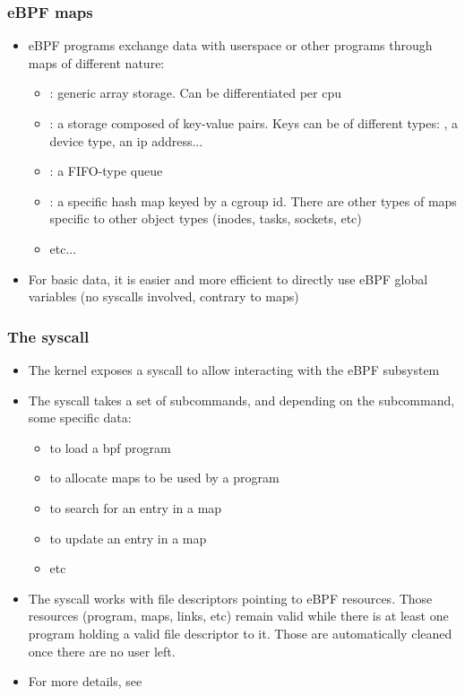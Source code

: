 \begin{frame}[fragile]
  \frametitle{eBPF maps}
  \begin{itemize}
    \item eBPF programs exchange data with userspace or other programs through
    maps of different nature:
    \begin{itemize}
      \item {}: generic array storage. Can be
      differentiated per cpu
      \item {}: a storage composed of key-value pairs.
      Keys can be of different types: , a device type, an ip address...
      \item {}: a FIFO-type queue
      \item {}: a specific hash map keyed by a
      cgroup id. There are other types of maps specific to other object types
      (inodes, tasks, sockets, etc)
      \item etc...
    \end{itemize}
    \item For basic data, it is easier and more efficient to directly use eBPF
    global variables (no syscalls involved, contrary to maps)
  \end{itemize}
\end{frame}

\begin{frame}[fragile]
  \frametitle{The  syscall}
  \begin{itemize}
    \item The kernel exposes a  syscall to allow interacting with the
    eBPF subsystem
    \item The syscall takes a set of subcommands, and depending on the
    subcommand, some specific data:
    \begin{itemize}
      \item {} to load a bpf program
      \item {} to allocate maps to be used by a program
      \item {} to search for an entry in a map
      \item {} to update an entry in a map
      \item etc
    \end{itemize}
    \item The syscall works with file descriptors pointing to eBPF resources.
    Those resources (program, maps, links, etc) remain valid while there is at least
    one program holding a valid file descriptor to it. Those are automatically cleaned
    once there are no user left.
    \item For more details, see  
  \end{itemize}
\end{frame}

